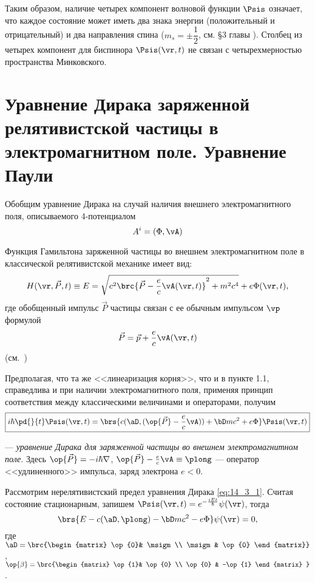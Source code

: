 Таким образом, наличие четырех компонент волновой функции $\Psis$ означает, что каждое состояние может иметь два знака энергии (положительный и отрицательный) и два направления спина ($m_s = \pm \dfrac{1}{2}$, см. \S 3 главы ). Столбец из четырех компонент для биспинора $\Psis(\vr, t)$ не связан с четырехмерностью пространства Минковского. 

\begin{sloppypar}
\section{Уравнение Дирака заряженной релятивистской частицы в электромагнитном поле. Уравнение Паули}
\end{sloppypar}

Обобщим уравнение Дирака на случай наличия внешнего электромагнитного поля, описываемого 4-потенциалом
$$
A^i=(\Phi, \vA)
$$

Функция Гамильтона заряженной частицы во внешнем электромагнитном поле в классической релятивистской механике имеет вид:
$$
H(\vr, \vec{P}, t) \equiv E = \sqrt{c^2\brc{\vec{P} - \frac{e}{c}\vA(\vr, t)}^2 + m^2c^4} + e\Phi(\vr, t),
$$
где обобщенный импульс $\vec{P}$ частицы связан с ее обычным импульсом $\vp$ формулой
$$
\vec{P} = \vec{p} + \frac{e}{c}\vA(\vr, t)
$$
(см.~)

Предполагая, что та же <<линеаризация корня>>, что и в пункте 1.1, справедлива и при наличии электромагнитного поля, применяя принцип соответствия между классическими величинами и операторами, получим  
\begin{equation}
\label{eq:14_3_1}
\boxed{i \hbar \pd{}{t} \Psis(\vr, t) = \brs{c(\aD, (\op{\vec{P}} - \frac{e}{c} \vA)) + \bD mc^2 + e\Phi} \Psis(\vr, t)}
\end{equation}

--- {\em уравнение Дирака для заряженной частицы во внешнем электромагнитном поле}. Здесь $\op{\vec{P}} = - i \hbar \nabla$, $\op{\vec{P}} - \frac{e}{c} \vA \equiv \plong$ --- оператор <<удлиненного>> импульса, заряд электрона $e < 0$.

Рассмотрим нерелятивистский предел уравнения Дирака \eqref{eq:14_3_1}. Считая состояние стационарным, запишем $\Psis(\vr, t) = e^{-\frac{iEt}{\hbar}} \psi(\vr)$, тогда
\begin{equation}
\label{eq:14_3_2}
\brs{E - c(\aD, \plong) - \bD mc^2 - e\Phi} \psi(\vr) = 0,
\end{equation}
где $\aD = \brc{\begin{matrix} \op{0}& \msigm \\ \msigm &  \op{0} \end{matrix}}$ , $\op{\beta} = \brc{\begin{matrix} \op{1}& \op{0} \\ \op{0} &  -\op{1} \end{matrix} }$.

